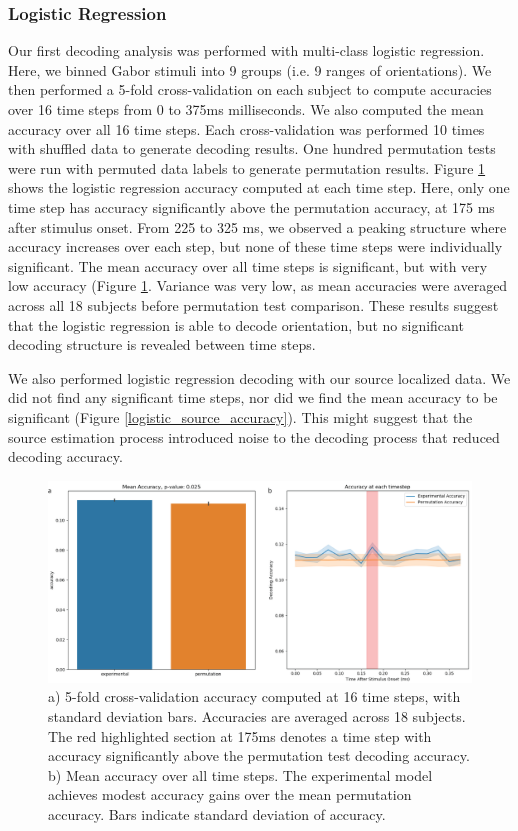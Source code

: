 \documentclass[../main.tex]{subfiles}
\begin{document}
\subsubsection{Logistic Regression}
Our first decoding analysis was performed with multi-class logistic regression. Here, we binned Gabor stimuli into 9 groups (i.e. 9 ranges of orientations). We then performed a 5-fold cross-validation on each subject to compute accuracies over 16 time steps from 0 to 375ms milliseconds. We also computed the mean accuracy over all 16 time steps. Each cross-validation was performed 10 times with shuffled data to generate decoding results. One hundred permutation tests were run with permuted data labels to generate permutation results. Figure \ref{logistic_sensor_accuracy} shows the logistic regression accuracy computed at each time step. Here, only one time step has accuracy significantly above the permutation accuracy, at 175 ms after stimulus onset. From 225 to 325 ms, we observed a peaking structure where accuracy increases over each step, but none of these time steps were individually significant. The mean accuracy over all time steps is significant, but with very low accuracy (Figure \ref{logistic_sensor_accuracy}. Variance was very low, as mean accuracies were averaged across all 18 subjects before permutation test comparison. These results suggest that the logistic regression is able to decode orientation, but no significant decoding structure is revealed between time steps. 

We also performed logistic regression decoding with our source localized data. We did not find any significant time steps, nor did we find the mean accuracy to be significant (Figure \ref{logistic_source_accuracy}). This might suggest that the source estimation process introduced noise to the decoding process that reduced decoding accuracy.


\begin{figure}
    \centering
    \includegraphics[scale=0.7]{figures/results/logistic_sensor_accuracy.png}
    \caption{a) 5-fold cross-validation accuracy computed at 16 time steps, with standard deviation bars. Accuracies are averaged across 18 subjects. The red highlighted section at 175ms denotes a time step with accuracy significantly above the permutation test decoding accuracy. b) Mean accuracy over all time steps. The experimental model achieves modest accuracy gains over the mean permutation accuracy. Bars indicate standard deviation of accuracy.}
    \label{logistic_sensor_accuracy}
\end{figure}
\end{document}
